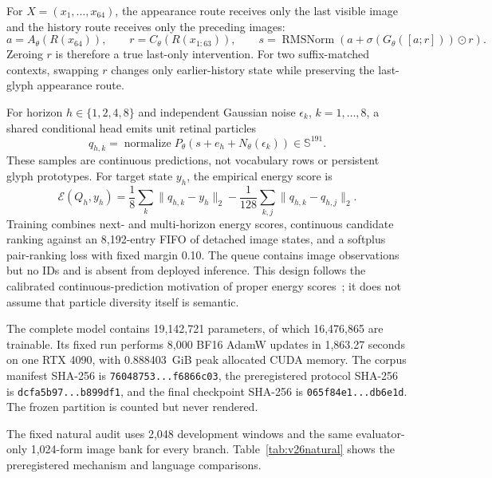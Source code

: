 \documentclass[11pt]{article}
\begin{document}
For $X=(x_1,\ldots,x_{64})$, the appearance route receives only the last
visible image and the history route receives only the preceding images:
\[
a=A_\theta(R(x_{64})),\qquad
r=C_\theta\!\left(R(x_{1:63})\right),\qquad
s=\operatorname{RMSNorm}\!\left(a+
\sigma(G_\theta([a;r]))\odot r\right).
\]
Zeroing $r$ is therefore a true last-only intervention. For two suffix-matched
contexts, swapping $r$ changes only earlier-history state while preserving the
last-glyph appearance route.

For horizon $h\in\{1,2,4,8\}$ and independent Gaussian noise
$\epsilon_k$, $k=1,\ldots,8$, a shared conditional head emits unit retinal
particles
\[
q_{h,k}=\operatorname{normalize}
P_\theta\!\left(s+e_h+N_\theta(\epsilon_k)\right)
\in\mathbb S^{191}.
\]
These samples are continuous predictions, not vocabulary rows or persistent
glyph prototypes. For target state $y_h$, the empirical energy score is
\[
\mathcal E(Q_h,y_h)=
\frac18\sum_k\lVert q_{h,k}-y_h\rVert_2
-\frac1{128}\sum_{k,j}\lVert q_{h,k}-q_{h,j}\rVert_2.
\]
Training combines next- and multi-horizon energy scores, continuous
candidate ranking against an 8,192-entry FIFO of detached image states, and a
softplus pair-ranking loss with fixed margin 0.10. The queue contains image
observations but no IDs and is absent from deployed inference. This design
follows the calibrated continuous-prediction motivation of proper energy
scores~\cite{continuousvar}; it does not assume that particle diversity itself
is semantic.

The complete model contains 19,142,721 parameters, of which 16,476,865 are
trainable. Its fixed run performs 8,000 BF16 AdamW updates in 1,863.27 seconds
on one RTX 4090, with 0.888403~GiB peak allocated CUDA memory. The corpus
manifest SHA-256 is \texttt{76048753...f6866c03}, the preregistered protocol
SHA-256 is \texttt{dcfa5b97...b899df1}, and the final checkpoint SHA-256 is
\texttt{065f84e1...db6e1d}. The frozen partition is counted but never rendered.

The fixed natural audit uses 2,048 development windows and the same
evaluator-only 1,024-form image bank for every branch. Table~\ref{tab:v26natural}
shows the preregistered mechanism and language comparisons.
\end{document}
